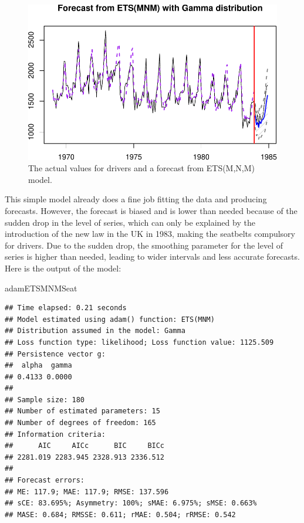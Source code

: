 \documentclass[]{book}
\newenvironment{Shaded}{\begin{snugshade}}{\end{snugshade}}
\newcommand{\NormalTok}[1]{#1}
\theoremstyle{definition}
\theoremstyle{definition}
\theoremstyle{definition}
\theoremstyle{definition}
\theoremstyle{remark}
\begin{document}
\begin{figure}
\centering
\includegraphics{Svetunkov--2022----ADAM_files/figure-latex/SeatbeltsForecast-1.pdf}
\caption{\label{fig:SeatbeltsForecast}The actual values for drivers and a forecast from ETS(M,N,M) model.}
\end{figure}

This simple model already does a fine job fitting the data and producing forecasts. However, the forecast is biased and is lower than needed because of the sudden drop in the level of series, which can only be explained by the introduction of the new law in the UK in 1983, making the seatbelts compulsory for drivers. Due to the sudden drop, the smoothing parameter for the level of series is higher than needed, leading to wider intervals and less accurate forecasts. Here is the output of the model:

\begin{Shaded}
\begin{Highlighting}[]
\NormalTok{adamETSMNMSeat}
\end{Highlighting}
\end{Shaded}

\begin{verbatim}
## Time elapsed: 0.21 seconds
## Model estimated using adam() function: ETS(MNM)
## Distribution assumed in the model: Gamma
## Loss function type: likelihood; Loss function value: 1125.509
## Persistence vector g:
##  alpha  gamma 
## 0.4133 0.0000 
## 
## Sample size: 180
## Number of estimated parameters: 15
## Number of degrees of freedom: 165
## Information criteria:
##      AIC     AICc      BIC     BICc 
## 2281.019 2283.945 2328.913 2336.512 
## 
## Forecast errors:
## ME: 117.9; MAE: 117.9; RMSE: 137.596
## sCE: 83.695%; Asymmetry: 100%; sMAE: 6.975%; sMSE: 0.663%
## MASE: 0.684; RMSSE: 0.611; rMAE: 0.504; rRMSE: 0.542
\end{verbatim}
\end{document}
